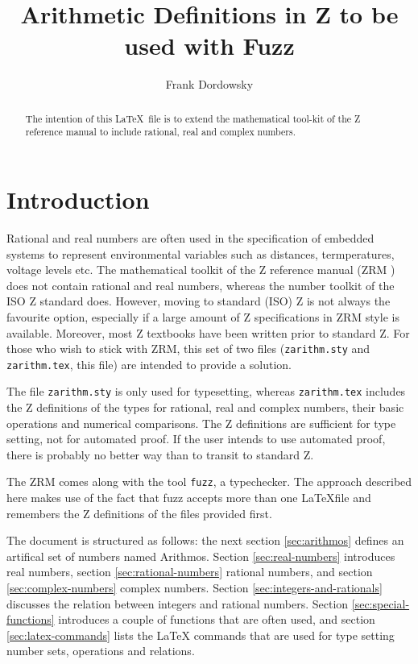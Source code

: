 \documentclass[12pt]{article}
\begin{document}
\title{Arithmetic Definitions in  Z to be used with Fuzz}

\author{Frank Dordowsky}

\maketitle

\begin{abstract}
  The intention of this \LaTeX\ file is to extend the mathematical
  tool-kit of the Z reference manual to include rational, real and
  complex numbers.
\end{abstract}


\section{Introduction}
\label{sec:intro}
Rational and real numbers are often used in the specification of
embedded systems to represent environmental variables such as
distances, termperatures, voltage levels etc. The mathematical toolkit
of the Z reference manual (ZRM \cite{Spivey1998}) does not contain
rational and real numbers, whereas the number toolkit of the ISO Z
standard does. However, moving to standard (ISO) Z \cite{ISO13568} is
not always the favourite option, especially if a large amount of Z
specifications in ZRM style is available. Moreover, most Z textbooks
have been written prior to standard Z. For those who wish to stick
with ZRM, this set of two files (\texttt{zarithm.sty} and
\texttt{zarithm.tex}, this file) are intended to provide a solution.

The file \texttt{zarithm.sty} is only used for typesetting, whereas
\texttt{zarithm.tex} includes the Z definitions of the types for
rational, real and complex numbers, their basic operations and
numerical comparisons. The Z definitions are sufficient for type
setting, not for automated proof. If the user intends to use automated
proof, there is probably no better way than to transit to standard Z.

The ZRM comes along with the tool \texttt{fuzz}, a typechecker. The
approach described here makes use of the fact that fuzz accepts more
than one \LaTeX file and remembers the Z definitions of the files
provided first.

The document is structured as follows: the next section
\ref{sec:arithmos} defines an artifical set of numbers named
Arithmos. Section \ref{sec:real-numbers} introduces real numbers,
section \ref{sec:rational-numbers} rational numbers, and section
\ref{sec:complex-numbers} complex numbers. Section
\ref{sec:integers-and-rationals} discusses the relation between
integers and rational numbers. Section \ref{sec:special-functions}
introduces a couple of functions that are often used, and section
\ref{sec:latex-commands} lists the \LaTeX{} commands that are used for
type setting number sets, operations and relations.
%
\end{document}
